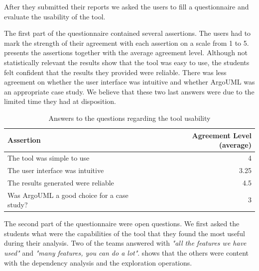 \documentclass[preprint,12pt]{elsarticle}
\begin{document}
After they submitted their reports we asked the users to fill a questionnaire and evaluate the usability of the tool. 

The first part of the questionnaire contained several assertions. The users had to mark the strength of their agreement with each assertion on a scale from 1 to 5.  presents the assertions together with the average agreement level. Although not statistically relevant the results show that the tool was easy to use, the students felt confident that the results they provided were reliable.%
 There was less agreement on whether the user interface was intuitive and whether ArgoUML was an appropriate case study. We believe that these two last answers were due to the limited time they had at disposition. %

\begin{table}[ht]
\begin{center}
\begin{tabular}{p{8cm} r}
\footnotesize{Assertion} & \footnotesize{Agreement Level (average)} \\ \hline
\footnotesize{The tool was simple to use} & \footnotesize{4}  \\
\footnotesize{The user interface was intuitive} & \footnotesize{3.25} \\
\footnotesize{The results generated were reliable} & \footnotesize{4.5} \\
\footnotesize{Was ArgoUML a good choice for a case study?} & \footnotesize{3} \\ \hline
\end{tabular}
\caption{Answers to the questions regarding the tool usability }
\label{tab:postsurvey}
\end{center}
\end{table}

The second part of the questionnaire were open questions. We first asked the students what were the capabilities of the tool that they found the most useful during their analysis. Two of the teams answered with {\em "all the features we have used"} and {\em "many features, you can do a lot"}.  shows that the others were content with the dependency analysis and the exploration operations.
\end{document}
